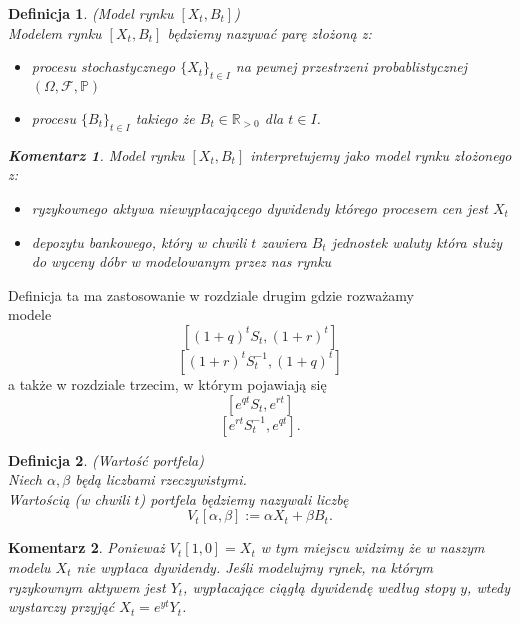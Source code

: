 \documentclass[11pt]{report}
\newtheorem{df}{Definicja}[chapter]
\newtheorem{koment}{Komentarz}[chapter]
\begin{document}
\begin{df}(Model rynku $[X_t, B_t]$) $ $ \\
Modelem rynku $[X_t, B_t]$ będziemy nazywać parę złożoną z:
\begin{itemize}
\item procesu stochastycznego $\{X_t\}_{t \in I}$ na pewnej przestrzeni probablistycznej  $(\Omega, \mathscr{F},\mathbb{P})$ 
\item procesu $\{ B_t \}_{t \in I} $ takiego że $B_t \in \mathbb{R}_{>0}$ dla $t \in I$.
\end{itemize}

\begin{koment}
Model rynku $[X_t, B_t]$ interpretujemy jako model rynku złożonego z:
\begin{itemize}
\item ryzykownego aktywa niewypłacającego dywidendy którego procesem cen jest $X_t$
\item depozytu bankowego, który w chwili $t$ zawiera $B_t$ jednostek waluty która służy do wyceny dóbr w 
modelowanym przez nas rynku
\end{itemize}  
\end{koment}




\end{df}





Definicja ta ma zastosowanie w rozdziale drugim gdzie rozważamy \\ modele
 $$[(1+q)^t S_t, (1+r)^t]$$ 
$$[(1+r)^{t}S_t^{-1}, (1+q)^t]$$ a także w rozdziale trzecim, w którym pojawiają się 
$$[e^{qt}S_t, e^{rt}]$$ $$[e^{rt}S_t^{-1}, e^{qt}].$$
$ $ \\
\begin{df}(Wartość portfela) $ $ \\
Niech $\alpha,\beta$ będą liczbami rzeczywistymi. \\
Wartością (w chwili $t$) portfela będziemy nazywali liczbę 
$$V_t[\alpha, \beta] := \alpha X_t + \beta B_t.$$
\end{df}

\begin{koment}
Ponieważ $V_t[1, 0] = X_t $ w tym miejscu widzimy że w naszym modelu $X_t$ nie wypłaca dywidendy. Jeśli modelujmy rynek, na którym ryzykownym aktywem jest $Y_t$, wypłacające ciągłą dywidendę według stopy $y$, wtedy wystarczy przyjąć $X_t = e^{yt}Y_t$.
\end{koment}
\end{document}

